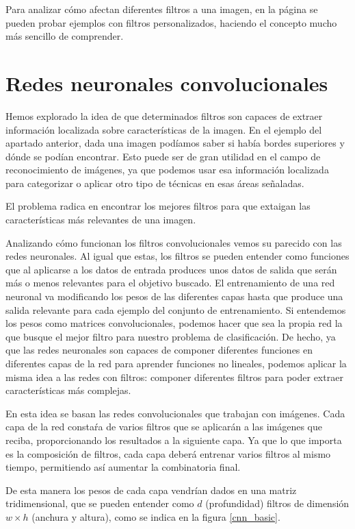Para analizar cómo afectan diferentes filtros a una imagen, en la página \parencite{visualizer_convolution} se pueden probar ejemplos con filtros personalizados, haciendo el concepto mucho más sencillo de comprender.

\section{Redes neuronales convolucionales}
\label{sec:conv-net}

Hemos explorado la idea de que determinados filtros son capaces de extraer información localizada sobre características de la imagen. En el ejemplo del apartado anterior, dada una imagen podíamos saber si había bordes superiores y dónde se podían encontrar. Esto puede ser de gran utilidad en el campo de reconocimiento de imágenes, ya que podemos usar esa información localizada para categorizar o aplicar otro tipo de técnicas en esas áreas señaladas.

El problema radica en encontrar los mejores filtros para que extaigan las características más relevantes de una imagen.

Analizando cómo funcionan los filtros convolucionales vemos su parecido con las redes neuronales. Al igual que estas, los filtros se pueden entender como funciones que al aplicarse a los datos de entrada produces unos datos de salida que serán más o menos relevantes para el objetivo buscado. El entrenamiento de una red neuronal va modificando los pesos de las diferentes capas hasta que produce una salida relevante para cada ejemplo del conjunto de entrenamiento. Si entendemos los pesos como matrices convolucionales, podemos hacer que sea la propia red la que busque el mejor filtro para nuestro problema de clasificación. De hecho, ya que las redes neuronales son capaces de componer diferentes funciones en diferentes capas de la red para aprender funciones no lineales, podemos aplicar la misma idea a las redes con filtros: componer diferentes filtros para poder extraer características más complejas.

En esta idea se basan las redes convolucionales que trabajan con imágenes. Cada capa de la red constaŕa de varios filtros que se aplicarán a las imágenes que reciba, proporcionando los resultados a la siguiente capa. Ya que lo que importa es la composición de filtros, cada capa deberá entrenar varios filtros al mismo tiempo, permitiendo así aumentar la combinatoria final.

De esta manera los pesos de cada capa vendrían dados en una matriz tridimensional, que se pueden entender como $d$ (profundidad) filtros de dimensión  $w \times h$ (anchura y altura), como se indica en la figura \ref{cnn_basic}.

